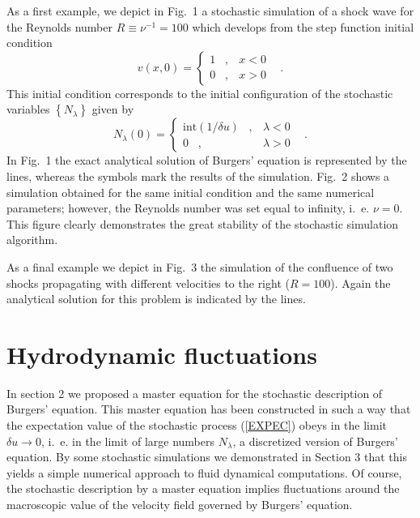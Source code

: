 As a first example, we depict in Fig.~1 a stochastic simulation of a shock
wave for the Reynolds number $R \equiv \nu^{-1}=100$
which develops from the step function initial condition
\begin{equation}
\label{INIT1}
v(x,0) = \left\{ \begin{array}{cc}
                 1 \;\;\;, & x<0  \\
                 0 \;\;\;, & x>0
                 \end{array} \right. \;\;\; .
\end{equation}
This initial condition corresponds to the initial configuration
of the stochastic variables $\left\{N_{\lambda}\right\}$ given by
\begin{equation}
\label{INIT2}
N_{\lambda}(0) = \left\{ \begin{array}{rc}
                 \mbox{int}(1/\delta u) \;\;\;, & \lambda < 0  \\
                 0 \;\;\;, & \lambda>0
                 \end{array} \right. \;\;\; .
\end{equation}
In Fig.~1 the exact analytical solution of Burgers' equation is represented
by the lines, whereas the symbols mark the results of the simulation.
Fig.~2 shows a simulation obtained for the same initial condition and the same
numerical parameters; however, the Reynolds number was set equal to
infinity, i.~e. $\nu = 0$. This figure clearly demonstrates the great stability
of the stochastic simulation algorithm. 

As a final example we depict in Fig.~3 the simulation of the
confluence of two shocks propagating with different velocities to the right
($R=100$). Again the analytical solution for this problem \cite{WHITHAM}
is indicated by the lines.

\section{Hydrodynamic fluctuations}
In section 2 we proposed a master equation for the stochastic
description of Burgers' equation. This master equation
has been constructed in such a way that the
expectation value of the stochastic process  (\ref{EXPEC}) obeys
in the limit $\delta u \longrightarrow 0$, i.~e. in the limit of
large numbers $N_{\lambda}$, a discretized version of Burgers' equation.
By some stochastic simulations we demonstrated in Section 3 that
this yields a simple numerical approach to fluid dynamical
computations. Of course, the stochastic description by a master equation
implies fluctuations around the macroscopic value of the
velocity field governed by Burgers' equation.

